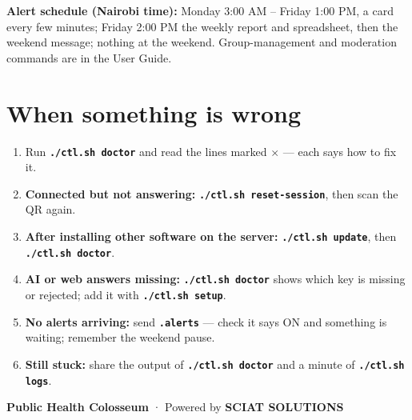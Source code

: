 \documentclass[11pt,a4paper]{article}
\newcommand{\cmd}[1]{\texttt{\textbf{#1}}}
\begin{document}
\textbf{Alert schedule (Nairobi time):} Monday 3:00 AM -- Friday 1:00 PM, a card every few minutes; Friday 2:00 PM the weekly report and spreadsheet, then the weekend message; nothing at the weekend. Group-management and moderation commands are in the User Guide.

\section{When something is wrong}

\begin{enumerate}[label=\textbf{\arabic*.},leftmargin=1.6em,itemsep=3pt]
  \item Run \cmd{./ctl.sh doctor} and read the lines marked \textbf{$\times$} --- each says how to fix it.
  \item \textbf{Connected but not answering:} \cmd{./ctl.sh reset-session}, then scan the QR again.
  \item \textbf{After installing other software on the server:} \cmd{./ctl.sh update}, then \cmd{./ctl.sh doctor}.
  \item \textbf{AI or web answers missing:} \cmd{./ctl.sh doctor} shows which key is missing or rejected; add it with \cmd{./ctl.sh setup}.
  \item \textbf{No alerts arriving:} send \cmd{.alerts} --- check it says ON and something is waiting; remember the weekend pause.
  \item \textbf{Still stuck:} share the output of \cmd{./ctl.sh doctor} and a minute of \cmd{./ctl.sh logs}.
\end{enumerate}

\vfill
\begin{center}
\color{phgrey}\small
\textbf{Public Health Colosseum} · Powered by \textbf{SCIAT SOLUTIONS}
\end{center}
\end{document}
